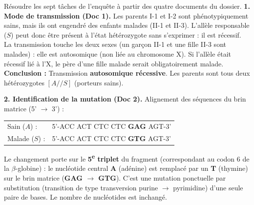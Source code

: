 \documentclass[11pt]{article}
\newcommand{\cle}[1]{{\popxbold\color{popdark}#1}}
\begin{document}
\begin{exoresolu}
Résoudre les sept tâches de l'enquête à partir des quatre documents du dossier.
\tcblower
\textbf{1. Mode de transmission (Doc 1).}
Les parents I-1 et I-2 sont phénotypiquement sains, mais ils ont engendré des enfants malades (II-1 et II-3). L'allèle responsable ($S$) peut donc être présent à l'état hétérozygote sans s'exprimer : il est \cle{récessif}.
La transmission touche les deux sexes (un garçon II-1 et une fille II-3 sont malades) : elle est \cle{autosomique} (non liée au chromosome X). Si l'allèle était récessif lié à l'X, le père d'une fille malade serait obligatoirement malade.
\textbf{Conclusion :} Transmission \textbf{autosomique récessive}. Les parents sont tous deux hétérozygotes \textbf{$[A//S]$} (porteurs sains).

\textbf{2. Identification de la mutation (Doc 2).}
Alignement des séquences du brin matrice (5' $\rightarrow$ 3') :
\begin{center}
\begin{tabular}{l l}
Sain ($A$) : & 5'-ACC ACT CTC CTC \textbf{GAG} AGT-3' \\
Malade ($S$) : & 5'-ACC ACT CTC CTC \textbf{GTG} AGT-3' \\
\end{tabular}
\end{center}
Le changement porte sur le \textbf{5\textsuperscript{e} triplet} du fragment (correspondant au codon 6 de la $\beta$-globine) : le nucléotide central \textbf{A} (adénine) est remplacé par un \textbf{T} (thymine) sur le brin matrice (\textbf{GAG $\rightarrow$ GTG}). C'est une \cle{mutation ponctuelle par substitution} (transition de type transversion purine $\rightarrow$ pyrimidine) d'une seule paire de bases. Le nombre de nucléotides est inchangé.


\end{exoresolu}
\end{document}
